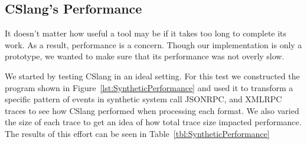 %
%
%
%


\subsection{CSlang's Performance}

It doesn't matter how useful a tool may be
if it takes too long to complete its work.
As a result, performance is a concern.  Though our implementation is
only a prototype, we wanted to make sure that its performance was not
overly slow.

We started by testing
CSlang
in an ideal setting.  For this test we constructed the program
shown in Figure~\ref{lst:SyntheticPerformance}
and used it to transform a specific
pattern of events in synthetic system call JSONRPC, and XMLRPC traces to
see how CSlang performed when processing each format.  We also varied the
size of each trace to get an idea of how total trace size impacted
performance.  The results of this effort can be seen in
Table~\ref{tbl:SyntheticPerformance}

